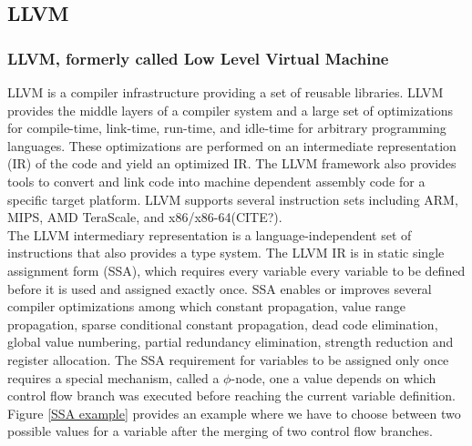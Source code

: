 \subsection{LLVM}
\subsubsection{LLVM, formerly called Low Level Virtual Machine}
LLVM is a compiler infrastructure providing a set of reusable libraries.
LLVM provides the middle layers of a compiler system and a large set of optimizations for compile-time, link-time, run-time, and idle-time for arbitrary programming languages.
These optimizations are performed on an intermediate representation (IR) of the code and yield an optimized IR.
The LLVM framework also provides tools to convert and link code into machine dependent assembly code for a specific target platform.
LLVM supports several instruction sets including ARM, MIPS, AMD TeraScale, and x86/x86-64(CITE?).\\

The LLVM intermediary representation is a language-independent set of instructions that also provides a type system.
The LLVM IR is in static single assignment form (SSA), which requires every variable every variable to be defined before it is used and assigned exactly once. 
SSA enables or improves several compiler optimizations among which constant propagation, value range propagation, sparse conditional constant propagation, dead code elimination, global value numbering, partial redundancy elimination, strength reduction and register allocation.
The SSA requirement for variables to be assigned only once requires a special mechanism, called a $\phi$-node, one a value depends on which control flow branch was executed before reaching the current variable definition.
Figure \ref{SSA example} provides an example where we have to choose between two possible values for a variable after the merging of two control flow branches.

